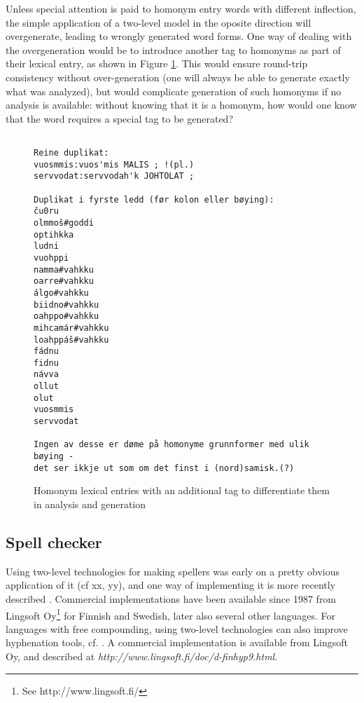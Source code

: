 \documentclass[a4paper,english]{article}
\begin{document}
Unless special attention is paid to homonym entry words with different inflection, the simple application of a two-level model in the oposite direction will overgenerate, leading to wrongly generated word forms. One way of dealing with the overgeneration would be to introduce another tag to homonyms as part of their lexical entry, as shown in Figure \ref{homonlex}. This would ensure round-trip consistency without over-generation (one will always be able to generate exactly what was analyzed), but would complicate generation of such homonyms if no analysis is available: without knowing that it is a homonym, how would one know that the word requires a special tag to be generated?

\begin{figure}[htb]
\caption{Homonym lexical entries with an additional tag to differentiate them in analysis and generation}
\begin{center}
\begin{verbatim}

Reine duplikat:
vuosmmis:vuos'mis MALIS ; !(pl.)
servvodat:servvodah'k JOHTOLAT ;

Duplikat i fyrste ledd (før kolon eller bøying):
ču0ru
olmmoš#goddi
optihkka
ludni
vuohppi
namma#vahkku
oarre#vahkku
álgo#vahkku
biidno#vahkku
oahppo#vahkku
mihcamár#vahkku
loahppáš#vahkku
fádnu
fidnu
návva
ollut
olut
vuosmmis
servvodat

Ingen av desse er døme på homonyme grunnformer med ulik bøying -
det ser ikkje ut som om det finst i (nord)samisk.(?)
\end{verbatim}
\end{center}
\label{homonlex}
\end{figure}

\subsection{Spell checker}\label{spell}

Using two-level technologies for making spellers was early on a pretty obvious application of it (cf xx, yy), and one way of implementing it is more recently described \cite{Beesley03}. Commercial implementations have been available since 1987 from Lingsoft Oy\footnote{See http://www.lingsoft.fi/} for Finnish and Swedish, later also several other languages. For languages with free compounding, using two-level technologies can also improve hyphenation tools, cf. \cite{Karlsson85}. A commercial implementation is available from Lingsoft Oy, and described at \textit{http://www.lingsoft.fi/doc/d-finhyp9.html}.
\end{document}
